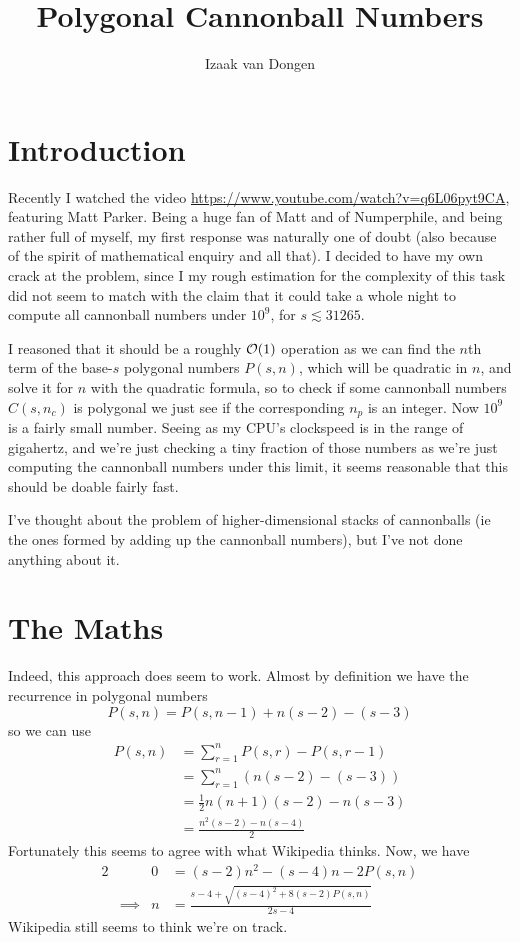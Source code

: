 \documentclass[fleqn,a4paper,11pt]{article}
\title{Polygonal Cannonball Numbers}
\author{Izaak van Dongen}
\begin{document}
\maketitle\thispagestyle{empty} %
\tableofcontents

\section{Introduction}

Recently I watched the video \url{https://www.youtube.com/watch?v=q6L06pyt9CA},
featuring Matt Parker.  Being a huge fan of Matt and of Numperphile, and being
rather full of myself, my first response was naturally one of doubt (also
because of the spirit of mathematical enquiry and all that). I decided to have
my own crack at the problem, since I my rough estimation for the complexity of
this task did not seem to match with the claim that it could take a whole night
to compute all cannonball numbers under \(10^9\), for \(s \lesssim 31265\).

I reasoned that it should be a roughly \(\operatorname{\mathcal O}(1)\) operation as we can find
the \(n\)th term of the base-\(s\) polygonal numbers \(P(s, n)\), which will
be quadratic in \(n\), and solve it for \(n\) with the quadratic formula, so
to check if some cannonball numbers \(C(s, n_c)\) is polygonal we just see
if the corresponding \(n_p\) is an integer. Now \(10^9\) is a fairly small
number. Seeing as my CPU's clockspeed is in the range of gigahertz, and
we're just checking a tiny fraction of those numbers as we're just computing
the cannonball numbers under this limit, it seems reasonable that this
should be doable fairly fast.

I've thought about the problem of higher-dimensional stacks of cannonballs (ie
the ones formed by adding up the cannonball numbers), but I've not done anything
about it.

\section{The Maths}

Indeed, this approach does seem to work. Almost by definition we have the
recurrence in polygonal numbers
\begin{equation*}
P(s, n) = P(s, n - 1) + n(s - 2) - (s - 3)
\end{equation*}
so we can use
\begin{align*}
P(s, n) &= \sum_{r = 1}^n P(s, r) - P(s, r - 1) \\
    &= \sum_{r = 1}^n (n(s - 2) - (s - 3)) \\
    &= \frac 12 n(n + 1)(s - 2) - n(s - 3) \\
    &= \frac{n^2(s - 2) - n(s - 4)} 2
\end{align*}
Fortunately this seems to agree with what Wikipedia thinks. Now, we have
\begin{alignat*}{2}
&& 0 &= (s - 2)n^2 - (s - 4)n - 2P(s, n) \\
&\implies& n &= \frac{s - 4 + \sqrt{(s - 4)^2 + 8(s - 2)P(s, n)}}{2s - 4}
\end{alignat*}
Wikipedia still seems to think we're on track.
\end{document}
